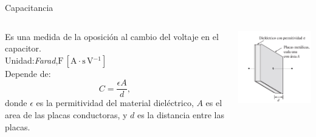 \documentclass[aspectratio=169]{beamer}
\begin{document}
\begin{frame}{Capacitancia}
    \begin{columns}[onlytextwidth]
    \begin{column}{0.6\textwidth}
        Es una medida de la oposición al cambio del voltaje en el capacitor.\\[6pt] 
        Unidad:\hspace{6pt}\emph{Farad},\hspace{6pt}$\si{\farad}\,[\si{\ampere\cdot\second\,\volt^{-1}}]$\\[6pt] 
        Depende de:
        \begin{equation*}
            C = \frac{\epsilon A}{d},
        \end{equation*}
        donde $\epsilon$ es la permitividad del material dieléctrico, $A$ es el area de las placas conductoras, y $d$ es la distancia entre las placas. 
    \end{column}
    \begin{column}{0.4\textwidth}
    \begin{center}
        \includegraphics[scale=0.8]{fig/capacitor.png}
    \end{center}
    \flushright \cite{charles2013fundamentos}
\end{column}
\end{columns}
\end{frame}
\end{document}
